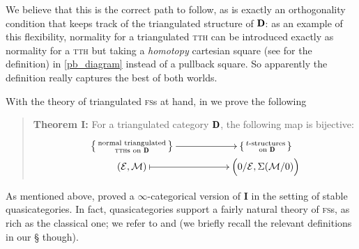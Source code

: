 We believe that this is the correct path to follow, as \adef{} is exactly an orthogonality condition that keeps track of the triangulated structure of $\cD$: as an example of this flexibility, normality for a triangulated \textsc{tth} can be introduced exactly as normality for a \textsc{tth} but taking a \emph{homotopy} cartesian square (see  for the definition) in \eqref{pb_diagram} instead of a pullback square. So apparently the definition really captures the best of both worlds.

With the theory of triangulated \textsc{fs}s at hand, in  we prove the following
\begin{quote}
\textbf{Theorem I:} For a triangulated category $\cD$, the following map is bijective:
\[
\xymatrix@R=0pt{
\left\{
{\begin{smallmatrix}
\text{normal triangulated}\\
\text{\textsc{tth}s on }\cD
\end{smallmatrix}}
\right\}
\ar[rr]&&
\left\{
{\begin{smallmatrix}
\text{$t$-structures}\\
\text{ on }\cD
\end{smallmatrix}}
\right\}\\
(\E,\M) \ar@{|->}[rr]&& \Big(0/\E, \Sigma(\M/0)\Big) 
}
\]
\end{quote}
As mentioned above, \cite{Fiorenza2014} proved a $\infty$\hyp{}categorical version of \athm\textbf{I} in the setting of stable quasicategories. In fact, quasicategories support a fairly natural theory of \textsc{fs}s, as rich as the classical one; we refer to \cite{joyal2008notes} and \cite{HTT} (we briefly recall the relevant definitions in our § though). 

